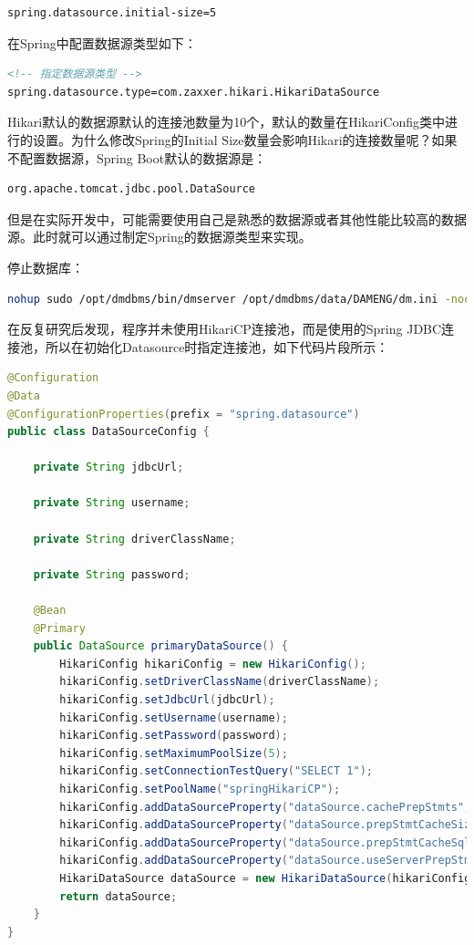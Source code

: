 \documentclass[12pt]{book}
\numberwithin{dummy}{section}
\theoremstyle{ocrenumbox}
\theoremstyle{blacknumex}
\theoremstyle{blacknumbox}
\theoremstyle{ocrenum}
\begin{document}
\begin{lstlisting}
spring.datasource.initial-size=5
\end{lstlisting}

在Spring中配置数据源类型如下：

\begin{lstlisting}[language=XML]
<!-- 指定数据源类型 -->
spring.datasource.type=com.zaxxer.hikari.HikariDataSource
\end{lstlisting}

Hikari默认的数据源默认的连接池数量为10个，默认的数量在HikariConfig类中进行的设置。为什么修改Spring的Initial Size数量会影响Hikari的连接数量呢？如果不配置数据源，Spring Boot默认的数据源是：

\begin{lstlisting}
org.apache.tomcat.jdbc.pool.DataSource
\end{lstlisting}

但是在实际开发中，可能需要使用自己是熟悉的数据源或者其他性能比较高的数据源。此时就可以通过制定Spring的数据源类型来实现。

停止数据库：

\begin{lstlisting}[language=Bash]
nohup sudo /opt/dmdbms/bin/dmserver /opt/dmdbms/data/DAMENG/dm.ini -noconsole &
\end{lstlisting}

在反复研究后发现，程序并未使用HikariCP连接池，而是使用的Spring JDBC连接池，所以在初始化Datasource时指定连接池，如下代码片段所示：

\begin{lstlisting}[language=Java]
@Configuration
@Data
@ConfigurationProperties(prefix = "spring.datasource")
public class DataSourceConfig {

	private String jdbcUrl;
	
	private String username;
	
	private String driverClassName;
	
	private String password;
	
	@Bean
	@Primary
	public DataSource primaryDataSource() {
		HikariConfig hikariConfig = new HikariConfig();
		hikariConfig.setDriverClassName(driverClassName);
		hikariConfig.setJdbcUrl(jdbcUrl);
		hikariConfig.setUsername(username);
		hikariConfig.setPassword(password);
		hikariConfig.setMaximumPoolSize(5);
		hikariConfig.setConnectionTestQuery("SELECT 1");
		hikariConfig.setPoolName("springHikariCP");
		hikariConfig.addDataSourceProperty("dataSource.cachePrepStmts", "true");
		hikariConfig.addDataSourceProperty("dataSource.prepStmtCacheSize", "250");
		hikariConfig.addDataSourceProperty("dataSource.prepStmtCacheSqlLimit", "2048");
		hikariConfig.addDataSourceProperty("dataSource.useServerPrepStmts", "true");
		HikariDataSource dataSource = new HikariDataSource(hikariConfig);
		return dataSource;
	}
}
\end{lstlisting}
\end{document}
